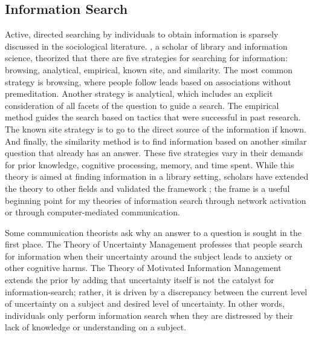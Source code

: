 \hypertarget{information-search}{\subsection{Information Search}\label{information-search}}

Active, directed searching by individuals to obtain information is sparsely
discussed in the sociological literature.
\citet{pejtersenDesignComputeraidedUsersystem1984}, a scholar of library and
information science, theorized that there are five strategies for searching for
information: browsing, analytical, empirical, known site, and similarity. The
most common strategy is browsing, where people follow leads based on
associations without premeditation. Another strategy is analytical, which
includes an explicit consideration of all facets of the question to guide a
search. The empirical method guides the search based on tactics that were
successful in past research. The known site strategy is to go to the direct
source of the information if known. And finally, the similarity method is to
find information based on another similar question that already has an answer.
These five strategies vary in their demands for prior knowledge, cognitive
processing, memory, and time spent. While this theory is aimed at finding
information in a library setting, scholars have extended the theory to other
fields and validated the framework \citep{fidelHumanInformationInteraction2012};
the frame is a useful beginning point for my theories of information search
through network activation or through computer-mediated communication.

Some communication theorists ask why an answer to a question is sought in the
first place. The Theory of Uncertainty Management
\citep{brashersCommunicationUncertaintyManagement2001} professes that people
search for information when their uncertainty around the subject leads to
anxiety or other cognitive harms. The Theory of Motivated Information Management
\citep{afifiTheoryMotivatedInformation2004, afifiSeekingInformationSexual2006}
extends the prior by adding that uncertainty itself is not the catalyst for
information-search; rather, it is driven by a discrepancy between the current
level of uncertainty on a subject and desired level of uncertainty. In other
words, individuals only perform information search when they are distressed by
their lack of knowledge or understanding on a subject.

